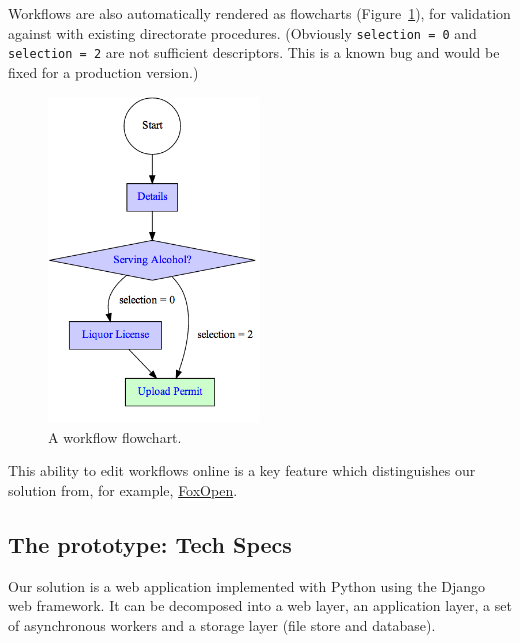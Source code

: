 \documentclass[12pt,a4paper,twosided]{article}
\begin{document}
Workflows are also automatically rendered as flowcharts (Figure~\ref{fig:workflow-flowchart}), 
for validation against with existing directorate procedures. (Obviously
\texttt{selection = 0} and \texttt{selection = 2} are not sufficient
descriptors. This is a known bug and would be fixed for a production
version.)

\begin{figure}[H]
  \centering
  \includegraphics[width=0.5\textwidth]{workflow.png}
  \caption{A workflow flowchart.}
  \label{fig:workflow-flowchart}
\end{figure}

This ability to edit workflows online is a key feature which
distinguishes our solution from, for example,
\href{http://www.foxopen.net/}{FoxOpen}.

\subsection{The prototype: Tech Specs}

Our solution is a web application implemented with Python using the
Django web framework. It can be decomposed into a web layer, an
application layer, a set of asynchronous workers and a storage layer
(file store and database).
\end{document}
